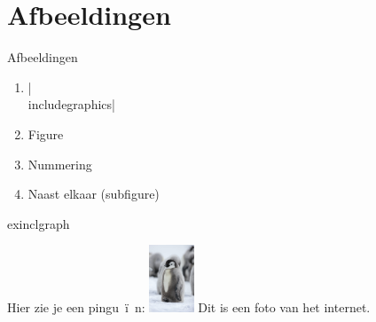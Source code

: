 \documentclass[../presentatie.tex]{subfiles}
\begin{document}
\section{Afbeeldingen}

\clearrecentlist

\begin{frame}{Afbeeldingen}
	\begin{enumerate}
		\item \hll|\\includegraphics|
		\item Figure
		\item Nummering
		\item Naast elkaar (subfigure)
	\end{enumerate}
\end{frame}


\begin{saveblock}{exinclgraph}
	\begin{highlightblock}[linewidth=0.95\textwidth,framexleftmargin=0.25em]
		Hier zie je een pingu~\"i~n:
		\includegraphics[height=2cm]{pinguin.jpg}
		Dit is een foto van het internet.
	\end{highlightblock}
\end{saveblock}

\newcommand\penExCode[2][2.5cm]{%
	\adjustbox{%
		raise={-\height},set height=0cm,set depth=#1}{%
			\adjustbox{
				max totalheight=#1,
			}{%
				\useblock{#2}%
			}%
	}
	\par%
	{\hspace{0.075\textwidth}\textcolor{red!30!white}{\rule{0.8\textwidth}{1px}}}\par
	\vspace{-\baselineskip}\vspace{0.3\baselineskip}%
}
\end{document}
